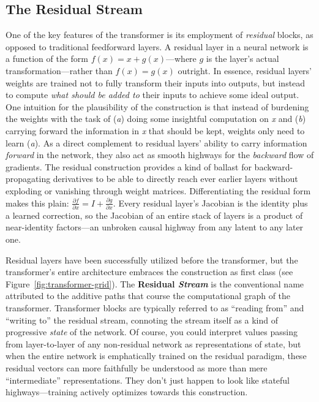 \documentclass{article}
\begin{document}
\subsection{The Residual Stream}\label{sec:resid}
One of the key features of the transformer is its employment of \textit{residual} blocks, as opposed to traditional feedforward layers. A residual layer in a neural network is a function of the form \(f(x) = x + g(x)\)---where \(g\) is the layer's actual transformation---rather than \(f(x) = g(x)\) outright. In essence, residual layers' weights are trained not to fully transform their inputs into outputs, but instead to compute \textit{what should be added to} their inputs to achieve some ideal output. One intuition for the plausibility of the construction is that instead of burdening the weights with the task of (\textit{a}) doing some insightful computation on \textit{x} and (\textit{b}) carrying forward the information in \textit{x} that should be kept, weights only need to learn (\textit{a}). As a direct complement to residual layers' ability to carry information \textit{forward} in the network, they also act as smooth highways for the \textit{backward} flow of gradients. The residual construction provides a kind of ballast for backward-propagating derivatives to be able to directly reach ever earlier layers without exploding or vanishing through weight matrices. Differentiating the residual form makes this plain: \(\frac{\partial f}{\partial x} = I + \frac{\partial g}{\partial x}\). Every residual layer's Jacobian is the identity plus a learned correction, so the Jacobian of an entire stack of layers is a product of near-identity factors---an unbroken causal highway from any latent to any later one. 

Residual layers have been successfully utilized before the transformer, but the transformer's entire architecture embraces the construction as first class (see Figure~\ref{fig:transformer-grid}). The \textbf{Residual \textit{Stream}} is the conventional name attributed to the additive paths that course the computational graph of the transformer. Transformer blocks are typically referred to as ``reading from'' and ``writing to'' the residual stream, connoting the stream itself as a kind of progressive \textit{state} of the network. Of course, you could interpret values passing from layer-to-layer of any non-residual network as representations of state, but when the entire network is emphatically trained on the residual paradigm, these residual vectors can more faithfully be understood as more than mere ``intermediate'' representations. They don't just happen to look like stateful highways---training actively optimizes towards this construction.
\end{document}

